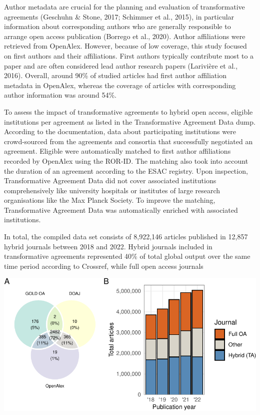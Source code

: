 \documentclass[a4paper,man,floatsintext,longtable,noextraspace,12pt]{apa6}
\begin{document}
Author metadata are crucial for the planning and evaluation of
transformative agreements (Geschuhn \& Stone, 2017; Schimmer et al.,
2015), in particular information about corresponding authors who are
generally responsible to arrange open access publication (Borrego et
al., 2020). Author affiliations were retrieved from OpenAlex. However,
because of low coverage, this study focused on first authors and their
affiliations. First authors typically contribute most to a paper and are
often considered lead author research papers (Larivière et al., 2016).
Overall, around 90\% of studied articles had first author affiliation
metadata in OpenAlex, whereas the coverage of articles with
corresponding author information was around 54\%.

To assess the impact of transformative agreements to hybrid open access,
eligible institutions per agreement as listed in the Transformative
Agreement Data dump. According to the documentation, data about
participating institutions were crowd-sourced from the agreements and
consortia that successfully negotiated an agreement. Eligible were
automatically matched to first author affiliations recorded by OpenAlex
using the ROR-ID. The matching also took into account the duration of an
agreement according to the ESAC registry. Upon inspection,
Transformative Agreement Data did not cover associated institutions
comprehensively like university hospitals or institutes of large
research organisations like the Max Planck Society. To improve the
matching, Transformative Agreement Data was automatically enriched with
associated institutions.

In total, the compiled data set consists of 8,922,146 articles published
in 12,857 hybrid journals between 2018 and 2022. Hybrid journals
included in transformative agreements represented 40\% of total global
output over the same time period according to Crossref, while full open
access journals

\begin{center}\includegraphics[width=0.99\linewidth]{fig/method_fig-1} \end{center}
\end{document}
